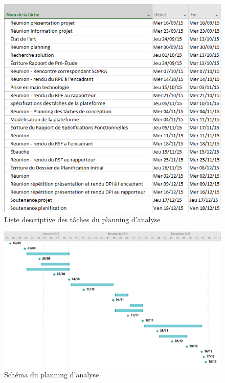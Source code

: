     \begin{figure}[ht!]
        \centering
        \includegraphics[width=1\textwidth]{figure/planning_description.png}
        \caption{Liste descriptive des tâches du planning d'analyse}
        \label{fig:gallica}
    \end{figure}

    \begin{figure}[ht!]
        \centering
        \includegraphics[width=1\textwidth]{figure/planning_schema.png}
        \caption{Schéma du planning d'analyse}
        \label{fig:gallica}
    \end{figure}
